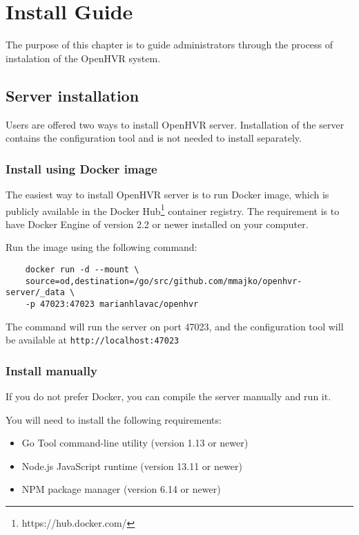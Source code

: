 \chapter{Install Guide}

The purpose of this chapter is to guide administrators through the process
of instalation of the OpenHVR system.

\section{Server installation}

Users are offered two ways to install OpenHVR server. Installation of the
server contains the configuration tool and is not needed to install separately.

\subsection{Install using Docker image}

The easiest way to install OpenHVR server is to run Docker image, which is
publicly available in the Docker Hub\footnote{https://hub.docker.com/}
container registry. The requirement is to have Docker Engine of version 2.2 or
newer installed on your computer. 

Run the image using the following command:

\begin{verbatim}
    docker run -d --mount \
    source=od,destination=/go/src/github.com/mmajko/openhvr-server/_data \
    -p 47023:47023 marianhlavac/openhvr
\end{verbatim}

The command will run the server on port 47023, and the configuration tool will
be available at \verb|http://localhost:47023|

\subsection{Install manually}

If you do not prefer Docker, you can compile the server manually and run it.

You will need to install the following requirements:

\begin{itemize}
    \item Go Tool command-line utility (version 1.13 or newer)
    \item Node.js JavaScript runtime (version 13.11 or newer) 
    \item NPM package manager (version 6.14 or newer)
\end{itemize}

